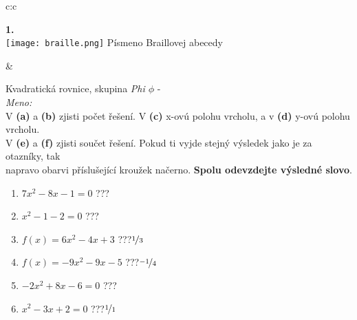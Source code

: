 \documentclass[10pt]{report}
\begin{document}
\begin{tabular}{c:c}
\begin{minipage}[c][99mm][t]{0.49\linewidth}
\begin{center}
\begin{minipage}{0.20\linewidth}
\begin{center}
{\Huge\bfseries 1.} \\[2mm]
\texttt{[image: braille.png]}
{\small Písmeno Braillovej abecedy}
\end{center}
\end{minipage}
\end{center}
\end{minipage}
&
\begin{minipage}[c][99mm][t]{0.49\linewidth}
\begin{center}
\vspace{7mm}
{\huge Kvadratická rovnice, skupina \textit{Phi $\phi$} -}\\[4.5mm]
\textit{Meno:}\phantom{xxxxxxxxxxxxxxxxxxxxxxxxxxxxxxxxxxxxxxxxxxxxxxxxxxxxxxxxxxxxxxxxx}\\[3.5mm]
V \textbf{(a)} a \textbf{(b)} zjisti počet řešení. V \textbf{(c)} x-ovú polohu vrcholu, a v \textbf{(d)} y-ovú polohu vrcholu.\\V \textbf{(e)} a \textbf{(f)} zjisti součet řešení. Pokud ti vyjde stejný výsledek jako je za otazníky, tak\\napravo obarvi příslušející kroužek načerno. \textbf{Spolu odevzdejte výsledné slovo}.\\[3mm]
\begin{minipage}{0.77\linewidth}
\begin{center}
\begin{varwidth}{\textwidth}
\begin{enumerate}
\large
\item $7x^2-8x-1=0$\quad \dotfill\; ???\;\dotfill {}
\item $x^2-1-2=0$\quad \dotfill\; ???\;\dotfill {}
\item $f(x)=6x^2-4x+3$\quad \dotfill\; ???\;\dotfill \quad $\nicefrac{1}{3}$
\item $f(x)=-9x^2-9x-5$\quad \dotfill\; ???\;\dotfill \quad $\nicefrac{-1}{4}$
\item $-2x^2+8x-6=0$\quad \dotfill\; ???\;\dotfill {}
\item $x^2-3x+2=0$\quad \dotfill\; ???\;\dotfill \quad $\nicefrac{1}{1}$
\end{enumerate}
\end{varwidth}
\end{center}
\end{minipage}
\begin{minipage}{0.20\linewidth}
\begin{center}

\end{center}
\end{minipage}
\end{center}
\end{minipage}
\end{tabular}
\end{document}
